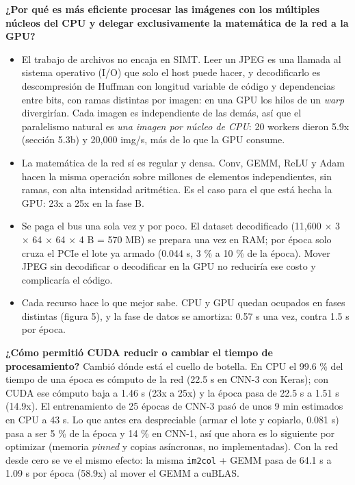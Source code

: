 \documentclass[
  11pt,
]{article}
\providecommand{\tightlist}{%
  \setlength{\itemsep}{0pt}\setlength{\parskip}{0pt}}
\begin{document}
\textbf{¿Por qué es más eficiente procesar las imágenes con los múltiples núcleos del CPU y delegar
exclusivamente la matemática de la red a la GPU?}
\begin{itemize}
\tightlist
\item El trabajo de archivos no encaja en SIMT. Leer un JPEG es una llamada al sistema
  operativo (I/O) que solo el host puede hacer, y decodificarlo es descompresión de Huffman con
  longitud variable de código y dependencias entre bits, con ramas distintas por imagen: en una
  GPU los hilos de un \emph{warp} divergirían. Cada imagen es independiente de las demás, así
  que el paralelismo natural es \emph{una imagen por núcleo de CPU}: 20 workers dieron 5.9x
  (sección 5.3b) y 20,000 img/s, más de lo que la GPU consume.
\item La matemática de la red sí es regular y densa. Conv, GEMM, ReLU y Adam hacen la
  misma operación sobre millones de elementos independientes, sin ramas, con alta intensidad
  aritmética. Es el caso para el que está hecha la GPU: 23x a 25x en la fase B.
\item Se paga el bus una sola vez y por poco. El dataset decodificado (11,600
  \(\times\) 3 \(\times\) 64 \(\times\) 64 \(\times\) 4 B = 570 MB) se prepara una vez en RAM;
  por época solo cruza el PCIe el lote ya armado (0.044 s, 3 \% a 10 \% de la época). Mover
  JPEG sin decodificar o decodificar en la GPU no reduciría ese costo y complicaría el código.
\item Cada recurso hace lo que mejor sabe. CPU y GPU quedan ocupados en fases
  distintas (figura 5), y la fase de datos se amortiza: 0.57 s una vez, contra 1.5 s por época.
\end{itemize}

\textbf{¿Cómo permitió CUDA reducir o cambiar el tiempo de procesamiento?} Cambió dónde está el
cuello de botella. En CPU el 99.6 \% del tiempo de una época es cómputo de la red (22.5 s en
CNN-3 con Keras); con CUDA ese cómputo baja a 1.46 s (23x a 25x) y la época pasa de 22.5 s a
1.51 s (14.9x). El entrenamiento de 25 épocas de CNN-3 pasó de unos 9 min estimados en CPU
a 43 s. Lo que antes era despreciable (armar el lote y copiarlo, 0.081 s) pasa a ser 5 \% de la
época y 14 \% en CNN-1, así que ahora es lo siguiente por optimizar (memoria \emph{pinned} y
copias asíncronas, no implementadas). Con la red desde cero se ve el mismo efecto: la misma
\texttt{im2col} + GEMM pasa de 64.1 s a 1.09 s por época (58.9x) al mover el GEMM a cuBLAS.
\end{document}
